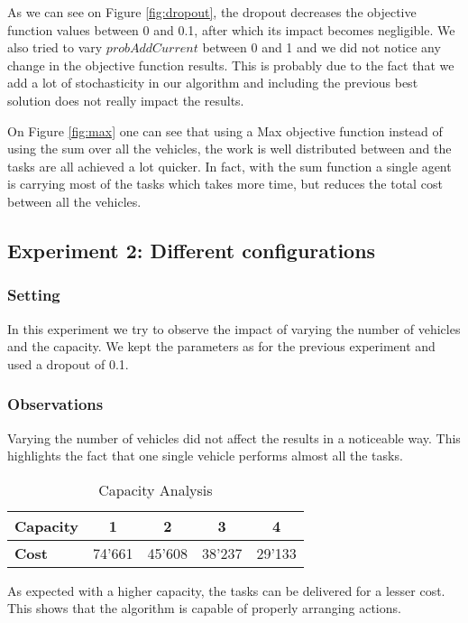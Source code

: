 \documentclass[11pt]{article}
\begin{document}
As we can see on Figure \ref{fig:dropout}, the dropout decreases the objective function values between 0 and 0.1, after which its impact becomes negligible. We also tried to vary $probAddCurrent$ between 0 and 1 and we did not notice any change in the objective function results. This is probably due to the fact that we add a lot of stochasticity in our algorithm and including the previous best solution does not really impact the results.

On Figure \ref{fig:max} one can see that using a Max objective function instead of using the sum over all the vehicles, the work is well distributed between and the tasks are all achieved a lot quicker. In fact, with the sum function a single agent is carrying most of the tasks which takes more time, but reduces the total cost between all the vehicles.

\subsection{Experiment 2: Different configurations}

\subsubsection{Setting}

In this experiment we try to observe the impact of varying the number of vehicles and the capacity. We kept the parameters as for the previous experiment and used a dropout of 0.1.

\subsubsection{Observations}
Varying the number of vehicles did not affect the results in a noticeable way. This highlights the fact that one single vehicle performs almost all the tasks.
\begin{table}[H]
\centering
\begin{tabular}{|l|c|c|c|c|}
\hline
\textbf{Capacity} & 1      & 2      & 3      & 4      \\ \hline
\textbf{Cost}   & 74'661 & 45'608 & 38'237 & 29'133 \\
       \hline
\end{tabular}
\caption{Capacity Analysis}
\end{table}
As expected with a higher capacity, the tasks can be delivered for a lesser cost. This shows that the algorithm is capable of properly arranging actions.




\end{document}
